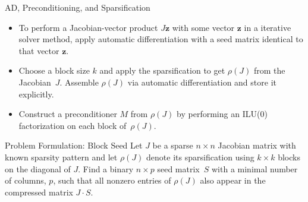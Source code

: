 \documentclass{beamer}
\newcommand{\vek}[1]{{\ensuremath{\mathbf #1}}}
\newcommand{\sparsifysymbol}{\ensuremath{\rho}}
\newcommand{\sparsify}[1]{\ensuremath{\sparsifysymbol(#1)}}
\begin{document}
\begin{frame}{AD, Preconditioning, and Sparsification}
\begin{itemize}
  \item To perform a Jacobian-vector product $J \vek{z}$ with some vector \vek{z} in a
      iterative solver method, apply automatic differentiation with a seed matrix
      identical to that vector \vek{z}. 
  \item Choose a block size $k$ and apply the sparsification to get \sparsify{J} from
      the Jacobian~$J$. Assemble \sparsify{J} via automatic differentiation and store
      it explicitly.
  \item Construct a preconditioner $M$ from \sparsify{J} by performing an ILU(0)
      factorization on each block of~\sparsify{J}. 
\end{itemize}
\end{frame}


\begin{frame}{Problem Formulation: Block Seed}
Let $J$ be a sparse $n \times n$ Jacobian matrix with known sparsity pattern and let
\sparsify{J} denote its sparsification using $k \times k$ blocks on the diagonal of $J$.
Find a binary $n \times p$ seed matrix~$S$ with a minimal number of columns, $p$, such
that all nonzero entries of \sparsify{J} also appear in the compressed matrix $J \cdot S$.
\end{frame}
\end{document}
